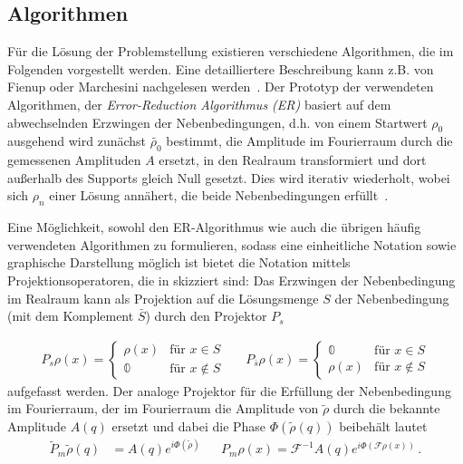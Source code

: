 \subsection{Algorithmen}
Für die Lösung der Problemstellung existieren verschiedene Algorithmen, die im Folgenden vorgestellt werden. Eine detailliertere Beschreibung kann z.B. von Fienup oder Marchesini nachgelesen werden~\cite{marchesini2007,fienup1982}.
Der Prototyp der verwendeten Algorithmen, der \textit{Error-Reduction Algorithmus (ER)} basiert auf dem abwechselnden Erzwingen der Nebenbedingungen, d.h. von einem Startwert $\rho_0$ ausgehend wird zunächst $\tilde{\rho_0}$ bestimmt, die Amplitude im Fourierraum durch die gemessenen Amplituden $A$ ersetzt, in den Realraum transformiert und dort außerhalb des Supports gleich Null gesetzt. Dies wird iterativ wiederholt, wobei sich $\rho_n$ einer Lösung annähert, die beide Nebenbedingungen erfüllt~\cite{fienup1978}.

Eine Möglichkeit, sowohl den ER-Algorithmus wie auch die übrigen häufig verwendeten Algorithmen zu formulieren, sodass eine einheitliche Notation sowie graphische Darstellung möglich ist bietet die Notation mittels Projektionsoperatoren, die in  skizziert sind:
Das Erzwingen der Nebenbedingung im Realraum kann als Projektion auf die Lösungsmenge $S$ der Nebenbedingung  (mit dem Komplement $\bar{S}$) durch den Projektor $P_s$ 

\begin{align}
	P_s\rho (x)=\begin{cases}
	\rho (x)  &\text{für } x\in S\\
	\mathbb{0}  &\text{für }x\notin S
	\end{cases} &   &   
	P_{\bar{s}}\rho (x)=\begin{cases}
	\mathbb{0} &\text{für } x\in S\\
	\rho (x)   &\text{für }x\notin S
	\end{cases}
\end{align}
aufgefasst werden. Der analoge Projektor für die Erfüllung der Nebenbedingung im Fourierraum, der im Fourierraum die Amplitude von $\tilde{\rho}$ durch die bekannte Amplitude $A(q)$ ersetzt und dabei die Phase $\Phi\left(\tilde{\rho}\left(q\right)\right)$ beibehält lautet
\begin{align}
	\tilde{P}_m \tilde{\rho}(q) & =A(q)e^{i\Phi(\tilde{\rho})} &   & P_m\rho(x)=\mathscr{F}^{-1}A(q)e^{i\Phi\left(\mathscr{F}\rho\left(x\right)\right)} \,. 
\end{align}

